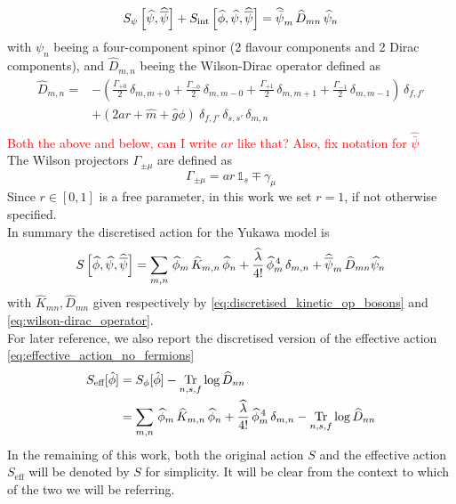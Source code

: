 \begin{equation}
		S_\psi\left[\widehat{\psi}, \widehat{\overline{\psi}} \right] + S_\text{int}\left[\widehat{\phi}, \widehat{\psi}, \widehat{\overline{\psi}} \right] = \widehat{\bar{\psi}}_m \, \widehat{D}_{mn} \, \widehat{\psi}_n 
\end{equation}
with $\psi_n$ beeing a four-component spinor (2 flavour components and 2 Dirac components), and $\widehat{D}_{m,n}$ beeing the Wilson-Dirac operator  defined as 
\begin{equation}
    \begin{aligned}
    \widehat{D}_{m, n} = &- \left(\frac{\Gamma_{+0}}{2} \, \delta_{m, m+0} +\frac{\Gamma_{-0}}{2} \, \delta_{m, m-0} + \frac{\Gamma_{+1}}{2} \, \delta_{m, m+1} + \frac{\Gamma_{-1}}{2} \, \delta_{m, m-1}\right) \, \delta _{f, f'} \\
     &+ \left(2ar + \hat m + \hat g \phi\right) \ \delta_{f,f'} \,\delta_{s,s'} \, \delta_{m,n} \\
    \end{aligned}
    \label{eq:wilson-dirac_operator}
\end{equation}
\textcolor{red}{Both the above and below, can I write $ar$ like that? Also, fix notation for $\hat{\bar\psi}$} \\
The Wilson projectors $\Gamma_{\pm \mu}$ are defined as
\begin{equation*}
    \Gamma_{\pm \mu} = ar \, \mathds{1}_s \mp \gamma_\mu 
\end{equation*}
Since $r \in [0,1]$ is a free parameter, in this work we set $r=1$, if not otherwise specified. \\
In summary the discretised action for the Yukawa model is 
\begin{equation*}
    S\left[\widehat{\phi}, \widehat{\psi}, \widehat{\overline{\psi}} \right] = \sum_{m,n} \, \widehat{\phi}_m \, \widehat{K}_{m,n} \, \widehat{\phi}_n + \frac{\widehat{\lambda}}{4!} \, \widehat{\phi}_m^{\,4} \, \delta_{m,n} + \widehat{\overline{\psi}}_m \, \widehat{D}_{mn} \widehat{\psi}_n
\end{equation*}
with $\widehat{K}_{mn}, \widehat{D}_{mn}$ given respectively by \eqref{eq:discretised_kinetic_op_bosons} and \eqref{eq:wilson-dirac_operator}. \\
For later reference, we also report the discretised version of the effective action \eqref{eq:effective_action_no_fermions}
\begin{equation}
	\begin{aligned}
		S_\text{eff}[\hat\phi] 	&= S_\phi[\hat\phi] - \underset{n,s,f}{\operatorname{\text{Tr}}} \log \widehat{D}_{nn} \\
							&= \sum_{m,n} \, \widehat{\phi}_m \, \widehat{K}_{m,n} \, \widehat{\phi}_n + \frac{\widehat{\lambda}}{4!} \, \widehat{\phi}_m^{\,4} \, \delta_{m,n} - \underset{n,s,f}{\operatorname{\text{Tr}}} \log \widehat{D}_{nn} 
	\end{aligned}
	\label{eq:discretised_effective_action}
\end{equation}
In the remaining of this work, both the original action $S$ and the effective action $S_\text{eff}$ will be denoted by $S$ for simplicity. It will be clear from the context to which of the two we will be referring. 

